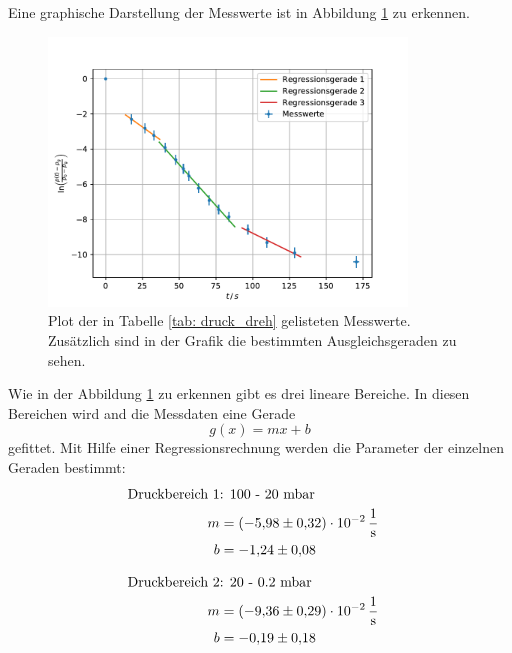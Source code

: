 Eine graphische Darstellung der Messwerte ist in Abbildung \ref{fig: druck_dreh} zu erkennen.

\FloatBarrier
\begin{figure}[h]
  \centering
  \includegraphics[width=0.85\textwidth]{../Messdaten/plots/dreh/druckplot_drehschieber.pdf}
  \caption{Plot der in Tabelle \ref{tab: druck_dreh} gelisteten Messwerte. Zusätzlich sind in der Grafik die bestimmten Ausgleichsgeraden zu sehen.}
  \label{fig: druck_dreh}
\end{figure}
\FloatBarrier

Wie in der Abbildung \ref{fig: druck_dreh} zu erkennen gibt es drei lineare Bereiche.
In diesen Bereichen wird and die Messdaten eine Gerade
\begin{equation}
  \label{eq: geradengleichung}
  g(x)=mx+b
\end{equation}
gefittet. Mit Hilfe einer Regressionsrechnung werden die Parameter der einzelnen Geraden bestimmt:
\begin{align}
  \label{eq: regression_dreh_druck_1}
  \begin{aligned}
  \text{Druckbereich 1} &\text{: 100 - 20 mbar}& \\
  m&=\SI{-5.98\pm0.32 e-2}{\per\second} \\
  b&=\num{-1.24 \pm0.08 }
\end{aligned}
\end{align}

\begin{align}
  \label{eq: regression_dreh_druck_2}
  \begin{aligned}
  \text{Druckbereich 2} &\text{: 20 - 0.2 mbar}& \\
  m&=\SI{-9.36\pm0.29 e-2}{\per\second} \\
  b&=\num{-0.19 \pm0.18 }
\end{aligned}
\end{align}

